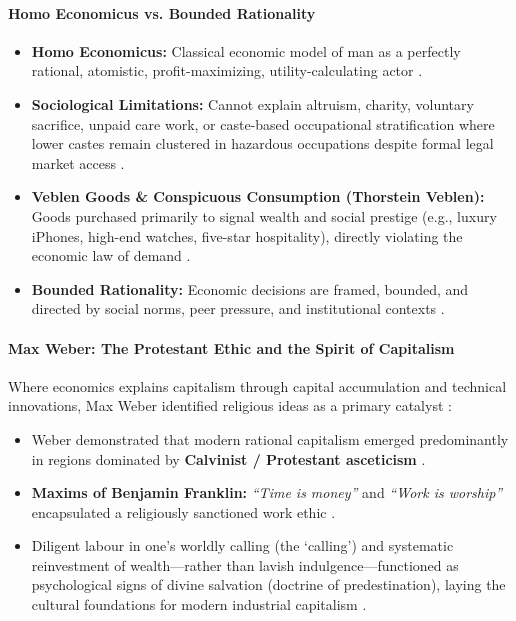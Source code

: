 \paragraph{Homo Economicus vs. Bounded Rationality}
\begin{KeyConcept}
\begin{itemize}
    \item \textbf{Homo Economicus:} Classical economic model of man as a perfectly rational, atomistic, profit-maximizing, utility-calculating actor .
    \item \textbf{Sociological Limitations:} Cannot explain altruism, charity, voluntary sacrifice, unpaid care work, or caste-based occupational stratification where lower castes remain clustered in hazardous occupations despite formal legal market access .
    \item \textbf{Veblen Goods \& Conspicuous Consumption (Thorstein Veblen):} Goods purchased primarily to signal wealth and social prestige (e.g., luxury iPhones, high-end watches, five-star hospitality), directly violating the economic law of demand .
    \item \textbf{Bounded Rationality:} Economic decisions are framed, bounded, and directed by social norms, peer pressure, and institutional contexts .
\end{itemize}
\end{KeyConcept}

\paragraph{Max Weber: The Protestant Ethic and the Spirit of Capitalism}
\begin{KeyConcept}
Where economics explains capitalism through capital accumulation and technical innovations, Max Weber identified religious ideas as a primary catalyst :
\begin{itemize}
    \item Weber demonstrated that modern rational capitalism emerged predominantly in regions dominated by \textbf{Calvinist / Protestant asceticism} .
    \item \textbf{Maxims of Benjamin Franklin:} \textit{``Time is money''} and \textit{``Work is worship''} encapsulated a religiously sanctioned work ethic .
    \item Diligent labour in one's worldly calling (the `calling') and systematic reinvestment of wealth---rather than lavish indulgence---functioned as psychological signs of divine salvation (doctrine of predestination), laying the cultural foundations for modern industrial capitalism .
\end{itemize}
\end{KeyConcept}

